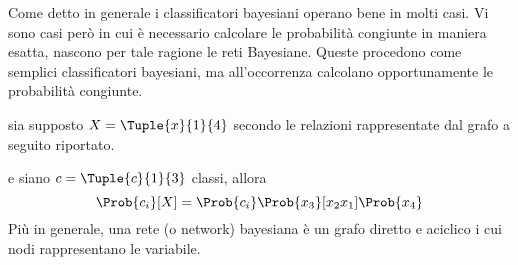 \documentclass{subfiles}
\begin{document}
Come detto in generale i classificatori bayesiani operano bene in molti casi.
Vi sono casi però in cui è necessario calcolare le probabilità congiunte in maniera esatta, nascono per tale ragione le reti Bayesiane.
Queste procedono come semplici classificatori bayesiani, ma all'occorrenza calcolano opportunamente le probabilità congiunte.
\begin{Example*}
    sia supposto \(X = \Tuple{x}{1}{4}\) secondo le relazioni rappresentate dal grafo a seguito riportato.
    

    \noindent e siano \(c = \Tuple{c}{1}{3}\) classi, allora
    \[
        \Prob{c_{i}}[X] = \Prob{c_{i}} \Prob{x_{3}}[x_{2}x_{1}] \Prob{x_{4}}
    \]
    Più in generale, una rete (o network) bayesiana è un grafo diretto e aciclico i cui nodi rappresentano le variabile.
\end{Example*}
\end{document}
